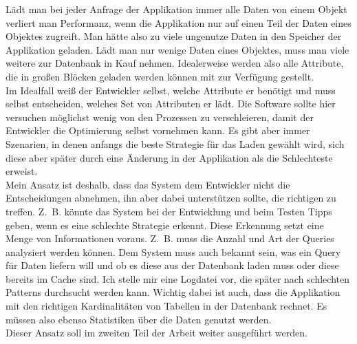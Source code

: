 Lädt man bei jeder Anfrage der Applikation immer alle Daten von einem Objekt verliert man Performanz, wenn die Applikation nur auf einen Teil der Daten eines Objektes zugreift. Man hätte also zu viele ungenutze Daten in den Speicher der Applikation geladen. Lädt man nur wenige Daten eines Objektes, muss man viele weitere  zur Datenbank in Kauf nehmen. Idealerweise werden also alle Attribute, die in großen Blöcken geladen werden können mit  zur Verfügung gestellt. \\
Im Idealfall weiß der Entwickler selbst, welche Attribute er benötigt und muss selbst entscheiden, welches Set von Attributen er lädt. Die Software sollte hier versuchen möglichst wenig von den Prozessen zu verschleieren, damit der Entwickler die Optimierung selbst vornehmen kann. Es gibt aber immer Szenarien, in denen anfangs die beste Strategie für das Laden gewählt wird, sich diese aber später durch eine Änderung in der Applikation als die Schlechteste erweist.\\
Mein Ansatz ist deshalb, dass das System dem Entwickler nicht die Entscheidungen abnehmen, ihn aber dabei unterstützen sollte, die richtigen zu treffen. Z.~B. könnte das System bei der Entwicklung und beim Testen Tipps geben, wenn es eine schlechte Strategie erkennt. Diese Erkennung setzt eine Menge von Informationen voraus. Z.~B. muss die Anzahl und Art der Queries analysiert werden können. Dem System muss auch bekannt sein, was ein Query für Daten liefern will und ob es diese aus der Datenbank laden muss oder diese bereits im Cache sind. Ich stelle mir eine Logdatei vor, die später nach schlechten Patterns durchsucht werden kann. Wichtig dabei ist auch, dass die Applikation mit den richtigen Kardinalitäten von Tabellen in der Datenbank rechnet. Es müssen also ebenso Statistiken über die Daten genutzt werden.\\
Dieser Ansatz soll im zweiten Teil der Arbeit weiter ausgeführt werden. \\

